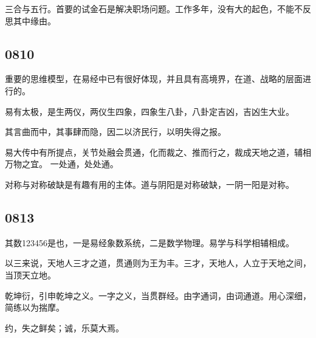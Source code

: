 三合与五行。首要的试金石是解决职场问题。工作多年，没有大的起色，不能不反思其中缘由。

\subsection{0810}

重要的思维模型，在易经中已有很好体现，并且具有高境界，在道、战略的层面进行的。

易有太极，是生两仪，两仪生四象，四象生八卦，八卦定吉凶，吉凶生大业。

其言曲而中，其事肆而隐，因二以济民行，以明失得之报。

易大传中有所提点，关节处融会贯通，化而裁之、推而行之，裁成天地之道，辅相万物之宜。
一处通，处处通。

对称与对称破缺是有趣有用的主体。道与阴阳是对称破缺，一阴一阳是对称。

\subsection{0813}

其数123456是也，一是易经象数系统，二是数学物理。易学与科学相辅相成。

以三来说，天地人三才之道，贯通则为王为丰。三才，天地人，人立于天地之间，当顶天立地。

乾坤衍，引申乾坤之义。一字之义，当贯群经。由字通词，由词通道。用心深细，简练以为揣摩。

约，失之鲜矣；诚，乐莫大焉。
